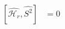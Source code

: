 \documentclass{article}
\begin{document}


\begin{equation}
\begin{split}
\label{}
[\hat{\mathcal{H}_r} ,\hat{S^2} ]&= 0
\end{split}
\end{equation}

 
\end{document}
